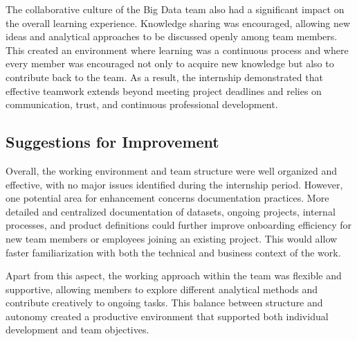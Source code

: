 \documentclass[12pt, a4paper, oneside]{report}
\begin{document}
The collaborative culture of the Big Data team also had a significant impact on the overall learning experience. Knowledge sharing was encouraged, allowing new ideas and analytical approaches to be discussed openly among team members. This created an environment where learning was a continuous process and where every member was encouraged not only to acquire new knowledge but also to contribute back to the team. As a result, the internship demonstrated that effective teamwork extends beyond meeting project deadlines and relies on communication, trust, and continuous professional development.

\subsection{Suggestions for Improvement}
Overall, the working environment and team structure were well organized and effective, with no major issues identified during the internship period. However, one potential area for enhancement concerns documentation practices. More detailed and centralized documentation of datasets, ongoing projects, internal processes, and product definitions could further improve onboarding efficiency for new team members or employees joining an existing project. This would allow faster familiarization with both the technical and business context of the work.

Apart from this aspect, the working approach within the team was flexible and supportive, allowing members to explore different analytical methods and contribute creatively to ongoing tasks. This balance between structure and autonomy created a productive environment that supported both individual development and team objectives.
\end{document}
